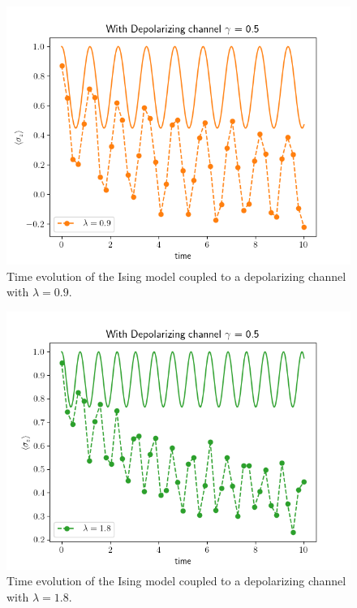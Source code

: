 \documentclass[12pt, twocolumn]{article}
\begin{document}
  \begin{figure}
    \centering
    \includegraphics[width=\linewidth]{images/DepolChannelLambda09.png}
    \caption{Time evolution of the Ising model coupled to a depolarizing channel with \( \lambda = 0.9 \).%
      \label{fig:DepolChannelLambda09}}
  \end{figure}

  \begin{figure}
    \centering
    \includegraphics[width=\linewidth]{images/DepolChannelLambda18.png}
    \caption{Time evolution of the Ising model coupled to a depolarizing channel with \( \lambda = 1.8 \).%
      \label{fig:DepolChannelLambda18}}
  \end{figure}
\end{document}
